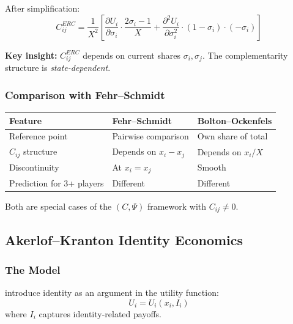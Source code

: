 \documentclass[12pt,a4paper]{article}
\begin{document}
After simplification:
\begin{equation}
  C_{ij}^{ERC} = \frac{1}{X^2} \left[ 
    \frac{\partial U_i}{\partial \sigma_i} \cdot \frac{2\sigma_i - 1}{X}
    + \frac{\partial^2 U_i}{\partial \sigma_i^2} \cdot (1-\sigma_i) \cdot (-\sigma_i)
  \right]
\end{equation}

\textbf{Key insight:} $C_{ij}^{ERC}$ depends on current shares $\sigma_i, \sigma_j$.
The complementarity structure is \emph{state-dependent}.

\subsubsection{Comparison with Fehr--Schmidt}

\begin{center}
\renewcommand{\arraystretch}{1.3}
\begin{tabular}{lll}
\hline
\textbf{Feature} & \textbf{Fehr--Schmidt} & \textbf{Bolton--Ockenfels} \\
\hline
Reference point & Pairwise comparison & Own share of total \\
$C_{ij}$ structure & Depends on $x_i - x_j$ & Depends on $x_i / X$ \\
Discontinuity & At $x_i = x_j$ & Smooth \\
Prediction for 3+ players & Different & Different \\
\hline
\end{tabular}
\end{center}

Both are special cases of the $(C, \Psi)$ framework with $C_{ij} \neq 0$.

\subsection{Akerlof--Kranton Identity Economics}
\label{app:akerlofkranton}

\subsubsection{The Model}

\citet{akerlofkranton} introduce identity as an argument in the utility function:
\begin{equation}
  U_i = U_i(x_i, I_i)
  \label{eq:akidentity}
\end{equation}
where $I_i$ captures identity-related payoffs.
\end{document}
